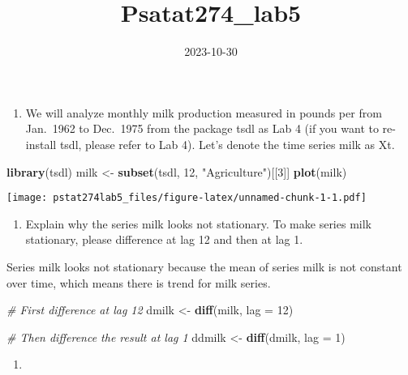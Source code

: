 \documentclass[
]{article}
\title{Psatat274\_lab5}
\author{}
\date{\vspace{-2.5em}2023-10-30}
\newenvironment{Shaded}{\begin{snugshade}}{\end{snugshade}}
\newcommand{\AttributeTok}[1]{\textcolor[rgb]{0.13,0.29,0.53}{#1}}
\newcommand{\CommentTok}[1]{\textcolor[rgb]{0.56,0.35,0.01}{\textit{#1}}}
\newcommand{\DecValTok}[1]{\textcolor[rgb]{0.00,0.00,0.81}{#1}}
\newcommand{\FunctionTok}[1]{\textcolor[rgb]{0.13,0.29,0.53}{\textbf{#1}}}
\newcommand{\NormalTok}[1]{#1}
\newcommand{\OtherTok}[1]{\textcolor[rgb]{0.56,0.35,0.01}{#1}}
\newcommand{\StringTok}[1]{\textcolor[rgb]{0.31,0.60,0.02}{#1}}
\providecommand{\tightlist}{%
  \setlength{\itemsep}{0pt}\setlength{\parskip}{0pt}}
\begin{document}
\maketitle

\begin{enumerate}
\def\labelenumi{\arabic{enumi}.}
\tightlist
\item
  We will analyze monthly milk production measured in pounds per from
  Jan.~1962 to Dec.~1975 from the package tsdl as Lab 4 (if you want to
  re-install tsdl, please refer to Lab 4). Let's denote the time series
  milk as Xt.
\end{enumerate}

\begin{Shaded}
\begin{Highlighting}[]
\FunctionTok{library}\NormalTok{(tsdl)}
\NormalTok{milk }\OtherTok{\textless{}{-}} \FunctionTok{subset}\NormalTok{(tsdl, }\DecValTok{12}\NormalTok{, }\StringTok{"Agriculture"}\NormalTok{)[[}\DecValTok{3}\NormalTok{]]}
\FunctionTok{plot}\NormalTok{(milk)}
\end{Highlighting}
\end{Shaded}

\texttt{[image: pstat274lab5\_files/figure-latex/unnamed-chunk-1-1.pdf]}

\begin{enumerate}
\def\labelenumi{(\alph{enumi})}
\tightlist
\item
  Explain why the series milk looks not stationary. To make series milk
  stationary, please difference at lag 12 and then at lag 1.
\end{enumerate}

Series milk looks not stationary because the mean of series milk is not
constant over time, which means there is trend for milk series.

\begin{Shaded}
\begin{Highlighting}[]
\CommentTok{\# First difference at lag 12 }
\NormalTok{dmilk }\OtherTok{\textless{}{-}} \FunctionTok{diff}\NormalTok{(milk, }\AttributeTok{lag =} \DecValTok{12}\NormalTok{)}

\CommentTok{\# Then difference the result at lag 1 }
\NormalTok{ddmilk }\OtherTok{\textless{}{-}} \FunctionTok{diff}\NormalTok{(dmilk, }\AttributeTok{lag =} \DecValTok{1}\NormalTok{)}
\end{Highlighting}
\end{Shaded}

\begin{enumerate}
\def\labelenumi{(\alph{enumi})}
\setcounter{enumi}{1}
\tightlist
\item
\end{enumerate}
\end{document}
